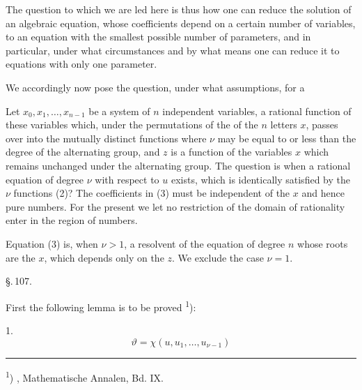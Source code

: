 
The question to which we are led here is thus how one can
reduce the solution of an algebraic equation, whose coefficients
depend on a certain number of variables, to an equation
with the smallest possible number of parameters, and in
particular, under what circumstances and by what means
one can reduce it to equations with only one
parameter.

We accordingly now pose the question, under what
assumptions, for a 

Let $x_0, x_1, \ldots, x_{n-1}$ be a system of $n$ independent variables,
a rational function of these variables which, under the permutations
of the  of the $n$ letters $x$, passes over into the
mutually distinct functions
where $\nu$ may be equal to or less than the degree of the alternating
group, and $z$ is a function of the variables $x$
which remains unchanged under the alternating group. The
question is when a rational equation of degree $\nu$ with respect
to $u$ exists,
which is identically satisfied by the $\nu$ functions (2)? The
coefficients in (3) must be independent of the $x$ and hence pure
numbers. For the present we let no restriction of the domain of rationality
enter in the region of numbers.

Equation (3) is, when $\nu > 1$, a resolvent of the
equation of degree $n$ whose roots are the $x$, which depends only on the
 $z$. We exclude the case $\nu = 1$.

\begin{center}
\S.\,107.

\end{center}

First the following lemma is to be proved \textsuperscript{1}):

1. 
\[
\vartheta = \chi(u, u_1, \ldots, u_{\nu-1})
\]

\begin{center}
\rule{0.3\linewidth}{0.4pt}
\end{center}

\textsuperscript{1}) , Mathematische Annalen, Bd. IX.
